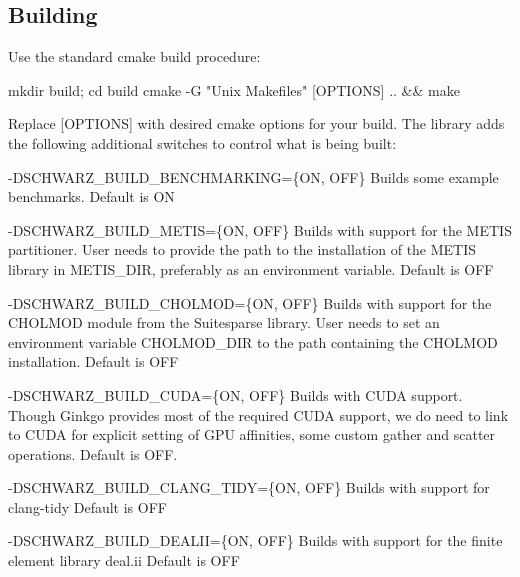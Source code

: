 \subsection*{Building}

Use the standard cmake build procedure\+:


\begin{DoxyCode}
mkdir build; cd build
cmake -G "Unix Makefiles" [OPTIONS] .. && make
\end{DoxyCode}


Replace {\ttfamily \mbox{[}O\+P\+T\+I\+O\+NS\mbox{]}} with desired cmake options for your build. The library adds the following additional switches to control what is being built\+:


\begin{DoxyItemize}
\item {\ttfamily -\/\+D\+S\+C\+H\+W\+A\+R\+Z\+\_\+\+B\+U\+I\+L\+D\+\_\+\+B\+E\+N\+C\+H\+M\+A\+R\+K\+I\+NG=\{ON, O\+FF\}} Builds some example benchmarks. Default is {\ttfamily ON}
\item {\ttfamily -\/\+D\+S\+C\+H\+W\+A\+R\+Z\+\_\+\+B\+U\+I\+L\+D\+\_\+\+M\+E\+T\+IS=\{ON, O\+FF\}} Builds with support for the {\ttfamily M\+E\+T\+IS} partitioner. User needs to provide the path to the installation of the {\ttfamily M\+E\+T\+IS} library in {\ttfamily M\+E\+T\+I\+S\+\_\+\+D\+IR}, preferably as an environment variable. Default is {\ttfamily O\+FF}
\item {\ttfamily -\/\+D\+S\+C\+H\+W\+A\+R\+Z\+\_\+\+B\+U\+I\+L\+D\+\_\+\+C\+H\+O\+L\+M\+OD=\{ON, O\+FF\}} Builds with support for the {\ttfamily C\+H\+O\+L\+M\+OD} module from the Suitesparse library. User needs to set an environment variable {\ttfamily C\+H\+O\+L\+M\+O\+D\+\_\+\+D\+IR} to the path containing the {\ttfamily C\+H\+O\+L\+M\+OD} installation. Default is {\ttfamily O\+FF}
\item {\ttfamily -\/\+D\+S\+C\+H\+W\+A\+R\+Z\+\_\+\+B\+U\+I\+L\+D\+\_\+\+C\+U\+DA=\{ON, O\+FF\}} Builds with C\+U\+DA support. Though Ginkgo provides most of the required C\+U\+DA support, we do need to link to C\+U\+DA for explicit setting of G\+PU affinities, some custom gather and scatter operations. Default is {\ttfamily O\+FF}.
\item {\ttfamily -\/\+D\+S\+C\+H\+W\+A\+R\+Z\+\_\+\+B\+U\+I\+L\+D\+\_\+\+C\+L\+A\+N\+G\+\_\+\+T\+I\+DY=\{ON, O\+FF\}} Builds with support for {\ttfamily clang-\/tidy} Default is {\ttfamily O\+FF}
\item {\ttfamily -\/\+D\+S\+C\+H\+W\+A\+R\+Z\+\_\+\+B\+U\+I\+L\+D\+\_\+\+D\+E\+A\+L\+II=\{ON, O\+FF\}} Builds with support for the finite element library {\ttfamily deal.\+ii} Default is {\ttfamily O\+FF}

\end{DoxyItemize}
